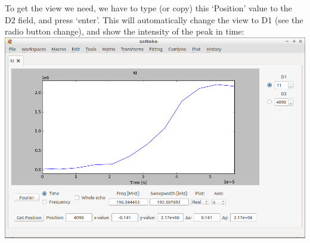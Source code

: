 \documentclass[11pt,a4paper]{article}
\begin{document}
To get the view we need, we have to type (or copy) this `Position' value to the D2 field, and press `enter'. This will automatically change the view to D1 (see the radio button change), and show the intensity of the peak in time:\\
\includegraphics[width=\linewidth]{Images/T1.png}
\end{document}
